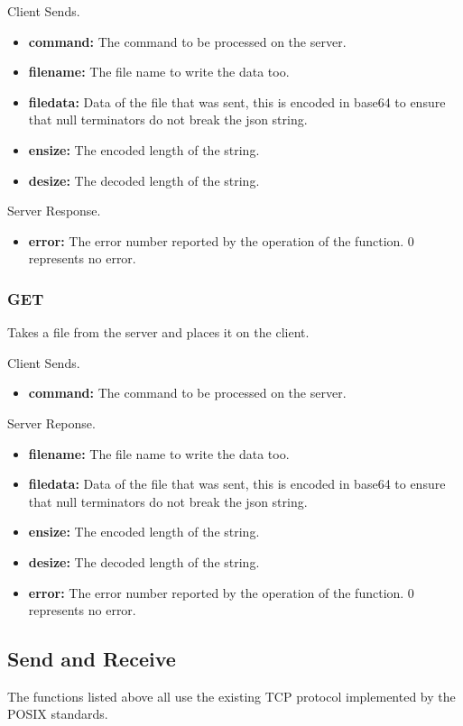 \documentclass{article}
\begin{document}
Client Sends.
\begin{itemize}
\item \textbf{command:} The command to be processed on the server.
\item \textbf{filename:} The file name to write the data too.
\item \textbf{filedata:} Data of the file that was sent, this is encoded in base64 to ensure that null terminators do not break the json string.
\item \textbf{ensize:} The encoded length of the string.
\item \textbf{desize:} The decoded length of the string.
\end{itemize}

Server Response.
\begin{itemize}
\item \textbf{error:} The error number reported by the operation of the function. 0 represents no error.
\end{itemize}

\subsubsection{GET}
Takes a file from the server and places it on the client.

Client Sends.
\begin{itemize}
\item \textbf{command:} The command to be processed on the server.
\end{itemize}

Server Reponse.
\begin{itemize}
\item \textbf{filename:} The file name to write the data too.
\item \textbf{filedata:} Data of the file that was sent, this is encoded in base64 to ensure that null terminators do not break the json string.
\item \textbf{ensize:} The encoded length of the string.
\item \textbf{desize:} The decoded length of the string.
\item \textbf{error:} The error number reported by the operation of the function. 0 represents no error.
\end{itemize}

\subsection{Send and Receive}
The functions listed above all use the existing TCP protocol implemented by the POSIX standards.
\end{document}
